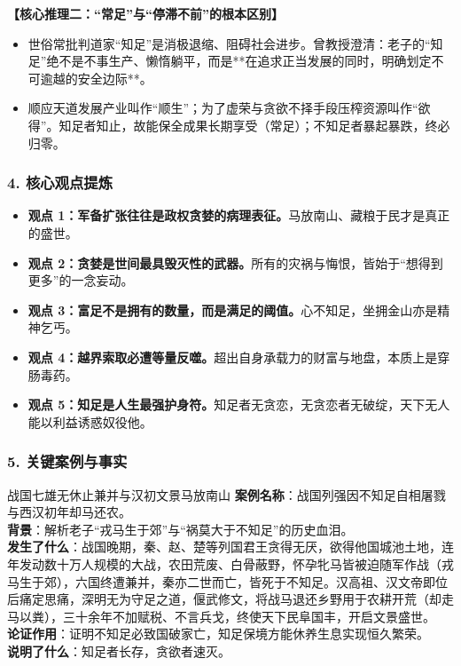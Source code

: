 \noindent\textbf{【核心推理二：“常足”与“停滞不前”的根本区别】}
\begin{itemize}
    \item 世俗常批判道家“知足”是消极退缩、阻碍社会进步。曾教授澄清：老子的“知足”绝不是不事生产、懒惰躺平，而是**在追求正当发展的同时，明确划定不可逾越的安全边际**。
    \item 顺应天道发展产业叫作“顺生”；为了虚荣与贪欲不择手段压榨资源叫作“欲得”。知足者知止，故能保全成果长期享受（常足）；不知足者暴起暴跌，终必归零。
\end{itemize}

\subsubsection{4. 核心观点提炼}
\begin{itemize}
    \item \textbf{观点 1：军备扩张往往是政权贪婪的病理表征。}马放南山、藏粮于民才是真正的盛世。
    \item \textbf{观点 2：贪婪是世间最具毁灭性的武器。}所有的灾祸与悔恨，皆始于“想得到更多”的一念妄动。
    \item \textbf{观点 3：富足不是拥有的数量，而是满足的阈值。}心不知足，坐拥金山亦是精神乞丐。
    \item \textbf{观点 4：越界索取必遭等量反噬。}超出自身承载力的财富与地盘，本质上是穿肠毒药。
    \item \textbf{观点 5：知足是人生最强护身符。}知足者无贪恋，无贪恋者无破绽，天下无人能以利益诱惑奴役他。
\end{itemize}

\subsubsection{5. 关键案例与事实}
\begin{CaseBox}{战国七雄无休止兼并与汉初文景马放南山}
\textbf{案例名称}：战国列强因不知足自相屠戮与西汉初年却马还农。\\
\textbf{背景}：解析老子“戎马生于郊”与“祸莫大于不知足”的历史血泪。\\
\textbf{发生了什么}：战国晚期，秦、赵、楚等列国君王贪得无厌，欲得他国城池土地，连年发动数十万人规模的大战，农田荒废、白骨蔽野，怀孕牝马皆被迫随军作战（戎马生于郊），六国终遭兼并，秦亦二世而亡，皆死于不知足。汉高祖、汉文帝即位后痛定思痛，深明无为守足之道，偃武修文，将战马退还乡野用于农耕开荒（却走马以粪），三十余年不加赋税、不言兵戈，终使天下民阜国丰，开启文景盛世。\\
\textbf{论证作用}：证明不知足必致国破家亡，知足保境方能休养生息实现恒久繁荣。\\
\textbf{说明了什么}：知足者长存，贪欲者速灭。
\end{CaseBox}

